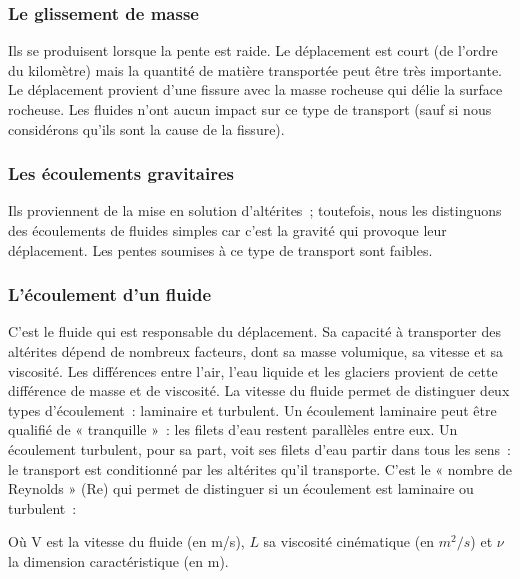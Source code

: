 \documentclass[a4paper,11pt]{article}
\begin{document}
\subsubsection{Le glissement de masse}

Ils se produisent lorsque la pente est raide.
Le déplacement est court (de l'ordre du kilomètre) mais la quantité de matière transportée peut être très importante.
Le déplacement provient d'une fissure avec la masse rocheuse qui délie la surface rocheuse.
Les fluides n'ont aucun impact sur ce type de transport (sauf si nous considérons qu'ils sont la cause de la fissure).

\subsubsection{Les écoulements gravitaires}

Ils proviennent de la mise en solution d'altérites~; toutefois, nous les distinguons des écoulements de fluides simples car c'est la gravité qui provoque leur déplacement. Les pentes soumises à ce type de transport sont faibles.

\subsubsection{L'écoulement d'un fluide}

C'est le fluide qui est responsable du déplacement.
Sa capacité à transporter des altérites dépend de nombreux facteurs, dont sa masse volumique, sa vitesse et sa viscosité.
Les différences entre l'air, l'eau liquide et les glaciers provient de cette différence de masse et de viscosité.
La vitesse du fluide permet de distinguer deux types d'écoulement~: laminaire et turbulent.
Un écoulement laminaire peut être qualifié de « tranquille »~: les filets d'eau restent parallèles entre eux.
Un écoulement turbulent, pour sa part, voit ses filets d'eau partir dans tous les sens~: le transport est conditionné par les altérites qu'il transporte.
C'est le « nombre de Reynolds » (Re) qui permet de distinguer si un écoulement est laminaire ou turbulent~:
\begin{center}
\end{center}
Où V est la vitesse du fluide (en m/s), $L$ sa viscosité cinématique (en $m^2/s$) et $\nu$ la dimension caractéristique (en m).
\end{document}
